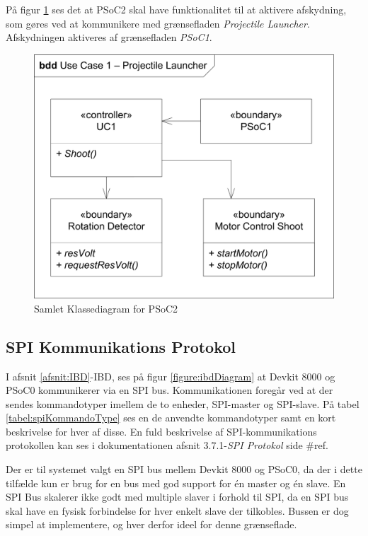 \noindent På figur \ref{fig:CompleteClassDiagramPSoC2} ses det at PSoC2 skal have funktionalitet til at aktivere afskydning, som gøres ved at kommunikere med grænsefladen \textit{Projectile Launcher}. Afskydningen aktiveres af grænsefladen \textit{PSoC1}.
\begin{figure}[H]
	\centering
	\includegraphics[width=\textwidth] {Systemarkitektur/images/affyringKlassediagram.png}
	\caption{Samlet Klassediagram for PSoC2}
	\label{fig:CompleteClassDiagramPSoC2}
\end{figure}

\subsection{SPI Kommunikations Protokol}
I afsnit \ref{afsnit:IBD}-IBD, ses på figur \ref{figure:ibdDiagram} at Devkit 8000 og PSoC0 kommunikerer via en SPI bus. Kommunikationen foregår ved at der sendes kommandotyper imellem de to enheder, SPI-master og SPI-slave. På tabel \ref{tabel:spiKommandoType} ses en de anvendte kommandotyper samt en kort beskrivelse for hver af disse. En fuld beskrivelse af SPI-kommunikations protokollen kan ses i dokumentationen afsnit 3.7.1-\textit{SPI Protokol} side \#ref.\newline

\noindent Der er til systemet valgt en SPI bus mellem Devkit 8000 og PSoC0, da der i dette tilfælde kun er brug for en bus med god support for én master og én slave. En SPI Bus skalerer ikke godt med multiple slaver i forhold til SPI, da en SPI bus skal have en fysisk forbindelse for hver enkelt slave der tilkobles. Bussen er dog simpel at implementere, og hver derfor ideel for denne grænseflade.

